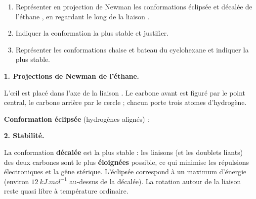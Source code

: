 \documentclass[11pt]{article}
\begin{document}
\begin{exoresolu}
\begin{enumerate}
\item Représenter en projection de Newman les conformations éclipsée et décalée de l'éthane , en regardant le long de la liaison .
\item Indiquer la conformation la plus stable et justifier.
\item Représenter les conformations chaise et bateau du cyclohexane  et indiquer la plus stable.
\end{enumerate}
\tcblower
\textbf{1. Projections de Newman de l'éthane.}

L'œil est placé dans l'axe de la liaison . Le carbone avant est figuré par le point central, le carbone arrière par le cercle ; chacun porte trois atomes d'hydrogène.

\textbf{Conformation éclipsée} (hydrogènes alignés) :
\begin{center}
\hspace{1.5cm}
\end{center}

\textbf{2. Stabilité.}

La conformation \textbf{décalée} est la plus stable : les liaisons  (et les doublets liants) des deux carbones sont le plus \textbf{éloignées} possible, ce qui minimise les répulsions électroniques et la gêne stérique. L'éclipsée correspond à un maximum d'énergie (environ $\SI{12}{kJ.mol^{-1}}$ au-dessus de la décalée). La rotation autour de la liaison  reste quasi libre à température ordinaire.


\end{exoresolu}
\end{document}
